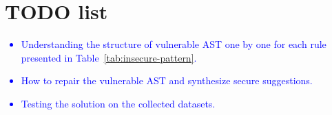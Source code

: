 \documentclass[sigconf]{acmart}
\begin{document}
\section{TODO list}
\textcolor{blue}{
\begin{itemize}
  \item Understanding the structure of vulnerable AST one by one for each rule presented in Table~\ref{tab:insecure-pattern}.
  \item How to repair the vulnerable AST and synthesize secure suggestions. 
  \item Testing the solution on the collected datasets.
\end{itemize}
}
\fi

  
  

\end{document}
